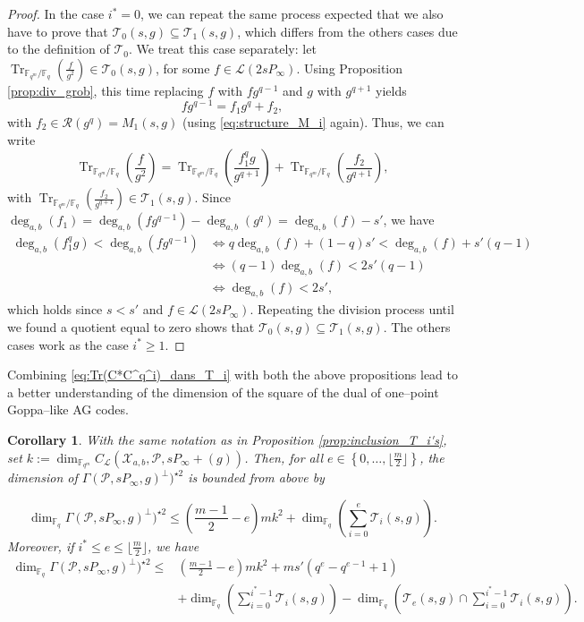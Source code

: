 \documentclass[a4paper]{amsart}
\newtheorem{coro}[thm]{Corollary}
\theoremstyle{definition}
\theoremstyle{remark}
\newcommand{\calP}{\mathcal{P}}
\newcommand{\calL}{\mathcal{L}}
\newcommand{\calR}{\mathcal{R}}
\newcommand{\calT}{\mathcal{T}}
\newcommand{\calX}{\mathcal{X}}
\newcommand{\fqm}{\mathbb{F}_{q^m}}
\newcommand{\fq}{\mathbb{F}_{q}}
\newcommand{\Tr}[1]{\operatorname{Tr}_{\mathbb{F}_{q^m}/\fq}\left(#1\right)}
\newcommand{\set}[1]{\left\{#1\right\}}
\newcommand{\degab}[1]{\deg_{a,b}\left(#1\right)}
\begin{document}
\begin{proof}
In the case $i^*=0$, we can repeat the same process expected that we also have to prove that $\calT_0(s,g) \subseteq \calT_1(s,g)$, which differs from the others cases due to the definition of $\calT_0$. We treat this case separately: let $\Tr{\frac{f}{g^2}} \in \calT_0(s,g)$, for some $f \in \calL(2sP_\infty)$. Using Proposition \ref{prop:div_grob}, this time replacing $f$ with $fg^{q-1}$ and $g$ with $g^{q+1}$ yields
$$fg^{q-1} = f_1g^q + f_2,$$ with $f_2 \in \calR(g^q) = M_1(s,g)$ (using \eqref{eq:structure_M_i} again).
Thus, we can write
    $$ \Tr{\frac{f}{g^2}} = \Tr{\frac{f_1^qg}{g^{q+1}}}  + \Tr{\frac{f_2}{g^{q+1}}}, $$
with $\Tr{\frac{f_2}{g^{q+1}}} \in \calT_1(s,g)$. Since $\degab{f_1} = \degab{fg^{q-1}} - \degab{g^q} = \degab{f}-s'$, we have 
\begin{align*}
     \degab{f_1^qg} < \degab{fg^{q-1}} & \iff q\degab{f} +(1-q)s' < \degab{f} + s'(q-1)\\
                                               & \iff (q-1)\degab{f} < 2s'(q-1)\\
                                               & \iff \degab{f} < 2s',
\end{align*}
which holds since $s<s'$ and $f \in \calL(2sP_\infty)$. Repeating the division process until we found a quotient equal to zero shows that $\calT_0(s,g) \subseteq \calT_1(s,g)$. The others cases work as the case $i^* \geq 1$.
\end{proof}
Combining \eqref{eq:Tr(C*C^q^i)_dans_T_i} with both the above propositions lead to a better understanding of the dimension of the square of the dual of one--point Goppa--like AG codes. 
\begin{coro} \label{coro:folklore_upper_bound}
 With the same notation as in Proposition \ref{prop:inclusion_T_i's}, set $k:=\dim_{\fqm}C_{\calL}(\calX_{a,b},\calP,sP_\infty+(g))$.
 Then, for all $e \in \set{0,\dots,\lfloor \frac{m}{2} \rfloor}$, the dimension of $\Gamma(\calP,sP_\infty,g)^{\perp})^{\star 2}$ is bounded from above by
 
\[\dim_{\fq} \Gamma(\calP,sP_\infty,g)^{\perp})^{\star 2} \leq   \left(\frac{m-1}{2}-e\right)mk^2+\dim_{\fq}\left(\sum\limits_{i=0}^e \calT_i(s,g) \right). \]
 Moreover, if $i^* \leq e \leq \lfloor \frac{m}{2} \rfloor$, we have 
 \begin{align*}
  \dim_{\fq} \Gamma(\calP,sP_\infty,g)^{\perp})^{\star 2} \leq   & \left(\frac{m-1}{2}-e\right)mk^2 + ms'(q^e-q^{e-1}+1) \\
  & + \dim_{\fq}\left(\sum\limits_{i=0}^{i^*-1} \calT_i(s,g)\right) - \dim_{\fq} \left( \calT_e(s,g) \cap   \sum\limits_{i=0}^{i^*-1} \calT_i(s,g)\right).
 \end{align*}

\end{coro}
\end{document}
